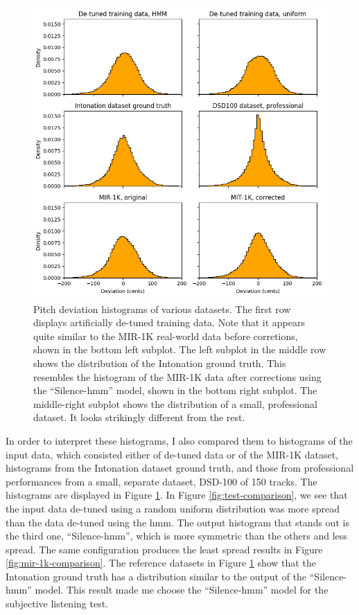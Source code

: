\begin{figure}[t!]
    \centering
    \includegraphics[width=\columnwidth]{figures/dataset-comparison.png}
    \caption{Pitch deviation histograms of various datasets. The first row displays artificially de-tuned training data. Note that it appears quite similar to the MIR-1K real-world data before corretions, shown in the bottom left subplot. The left subplot in the middle row shows the distribution of the Intonation ground truth. This resembles the histogram of the MIR-1K data after corrections using the ``Silence-\gls{hmm}'' model, shown in the bottom right subplot. The middle-right subplot shows the distribution of a small, professional dataset. It looks strikingly different from the rest.}
    \label{fig:dataset-comparison}
\end{figure}


In order to interpret these histograms, I also compared them to histograms of the input data, which consisted either of de-tuned data or of the MIR-1K dataset, histograms from the Intonation dataset ground truth, and those from professional performances from a small, separate dataset, DSD-100 \cite{SiSEC16} of 150 tracks. The histograms are displayed in Figure \ref{fig:dataset-comparison}. In Figure \ref{fig:test-comparison}, we see that the input data de-tuned using a random uniform distribution was more spread than the data de-tuned using the \gls{hmm}. The output histogram that stands out is the third one, ``Silence-\gls{hmm}'', which is more symmetric than the others and less spread. The same configuration produces the least spread results in Figure \ref{fig:mir-1k-comparison}. The reference datasets in Figure \ref{fig:dataset-comparison} show that the Intonation ground truth has a distribution similar to the output of the ``Silence-\gls{hmm}'' model. This result made me choose the ``Silence-\gls{hmm}'' model for the subjective listening test.

